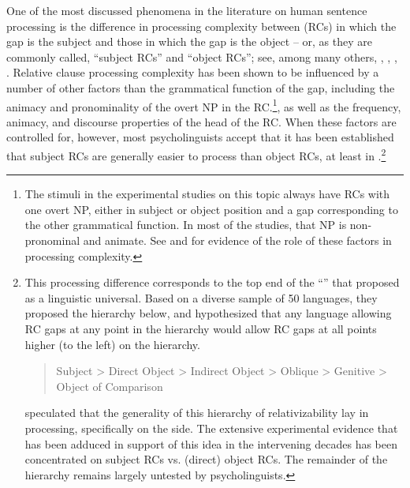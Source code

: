 \documentclass[a4paper]{article}
\begin{document}
One of the most discussed phenomena in the literature on human sentence processing is the difference in processing complexity between  (RCs) in which the gap is the subject and those in which the gap is the object -- or, as they are commonly called, ``subject RCs'' and ``object RCs''; see, among many others, \citet{WannerMaratsos78}, \citet{Gibson98a}, \citet{TraxlerEtal2002}, \citet{GennariMacDonald2008}.  Relative clause processing complexity has been shown to be influenced by a number of other factors than the grammatical function of the gap, including the animacy and pronominality of the overt NP in the RC.\footnote{The stimuli in the experimental studies on this topic always have RCs with one overt NP, either in subject or object position and a gap corresponding to the other grammatical function. In most of the studies, that NP is non-pronominal and animate.  See \citet{RealiChristiansen07} and \citet{RolandEtal2012} for evidence of the role of these factors in processing complexity.}, as well as the frequency, animacy, and discourse properties of the head of the RC.  When these factors are controlled for, however, most psycholinguists accept that it has been established that subject RCs are generally easier to process than object RCs, at least in .\footnote{This processing difference corresponds to the top end of the ``'' that \citet{KC77a} proposed as a linguistic universal. Based on a diverse sample of 50 languages, they proposed the hierarchy below, and hypothesized that any language allowing RC gaps at any point in the hierarchy would allow RC gaps at all points higher (to the left) on the hierarchy.
\begin{quote}

Subject 
> 
Direct Object 
> 
Indirect Object 
> 
Oblique 
> 
Genitive
> 
Object of Comparison
\end{quote}
\citeauthor{KC77a} speculated that the generality of this hierarchy of relativizability lay in processing, specifically on the  side.  The extensive experimental evidence that has been adduced in support of this idea in the intervening decades has been concentrated on subject RCs vs. (direct) object RCs.  The remainder of the hierarchy remains largely untested by psycholinguists.}
\end{document}
